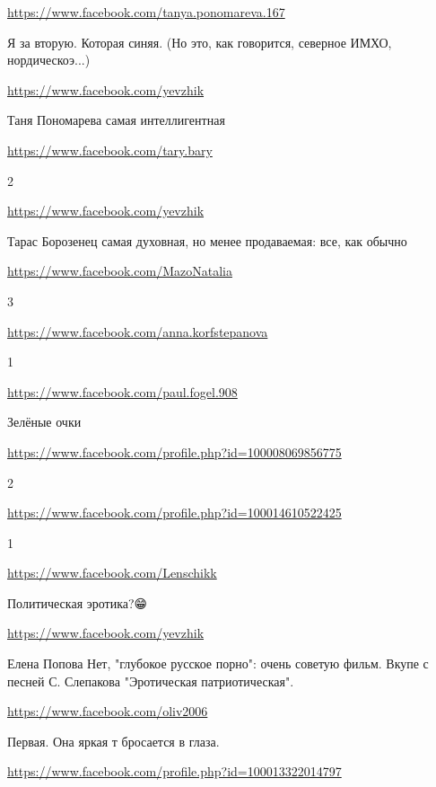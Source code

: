 \documentclass[a4paper,11pt]{extreport}
\begin{document}
\begin{itemize}
\url{https://www.facebook.com/tanya.ponomareva.167}

Я за вторую. Которая синяя. (Но это, как говорится, северное ИМХО, нордическоэ...)

\begin{itemize}
\url{https://www.facebook.com/yevzhik}

Таня Пономарева самая интеллигентная

\end{itemize}
\url{https://www.facebook.com/tary.bary}

2

\begin{itemize}
\url{https://www.facebook.com/yevzhik}

Тарас Борозенец самая духовная, но менее продаваемая: все, как обычно

\end{itemize}
\url{https://www.facebook.com/MazoNatalia}

3

\url{https://www.facebook.com/anna.korfstepanova}

1

\url{https://www.facebook.com/paul.fogel.908}

Зелёные очки

\url{https://www.facebook.com/profile.php?id=100008069856775}

2

\url{https://www.facebook.com/profile.php?id=100014610522425}

1

\url{https://www.facebook.com/Lenschikk}

Политическая эротика?😁

\begin{itemize}
\url{https://www.facebook.com/yevzhik}

Елена Попова Нет, "глубокое русское порно": очень советую фильм. Вкупе с песней С. Слепакова "Эротическая патриотическая".

\end{itemize}
\url{https://www.facebook.com/oliv2006}

Первая. Она яркая т бросается в глаза.

\url{https://www.facebook.com/profile.php?id=100013322014797}


\end{itemize}
\end{document}
